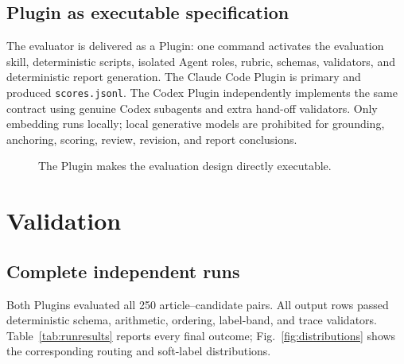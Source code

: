 \documentclass[conference]{IEEEtran}
\begin{document}
\subsection{Plugin as executable specification}
The evaluator is delivered as a Plugin: one command activates the evaluation skill, deterministic scripts, isolated Agent roles, rubric, schemas, validators, and deterministic report generation. The Claude Code Plugin is primary and produced \texttt{scores.jsonl}. The Codex Plugin independently implements the same contract using genuine Codex subagents and extra hand-off validators. Only embedding runs locally; local generative models are prohibited for grounding, anchoring, scoring, review, revision, and report conclusions.

\begin{figure}[t]
\centering
{}
\caption{The Plugin makes the evaluation design directly executable.}
\label{fig:plugin}
\end{figure}

\section{Validation}
\subsection{Complete independent runs}
Both Plugins evaluated all 250 article--candidate pairs. All output rows passed deterministic schema, arithmetic, ordering, label-band, and trace validators. Table~\ref{tab:runresults} reports every final outcome; Fig.~\ref{fig:distributions} shows the corresponding routing and soft-label distributions.
\end{document}
